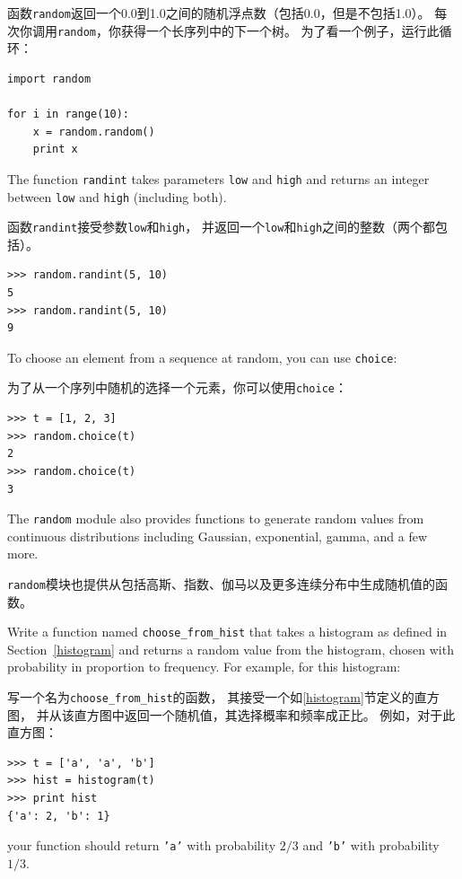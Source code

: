 \documentclass[10pt]{book}
\begin{document}
\begin{CJK}{UTF8}{gbsn}
函数{\tt random}返回一个0.0到1.0之间的随机浮点数（包括0.0，但是不包括1.0）。
每次你调用{\tt random}，你获得一个长序列中的下一个树。
为了看一个例子，运行此循环：

\begin{verbatim}
import random

for i in range(10):
    x = random.random()
    print x
\end{verbatim}
%
The function {\tt randint} takes parameters {\tt low} and
{\tt high} and returns an integer between {\tt low} and
{\tt high} (including both).

函数{\tt randint}接受参数{\tt low}和{\tt high}，
并返回一个{\tt low}和{\tt high}之间的整数（两个都包括）。

\begin{verbatim}
>>> random.randint(5, 10)
5
>>> random.randint(5, 10)
9
\end{verbatim}
%
To choose an element from a sequence at random, you can use
{\tt choice}:

为了从一个序列中随机的选择一个元素，你可以使用{\tt choice}：

\begin{verbatim}
>>> t = [1, 2, 3]
>>> random.choice(t)
2
>>> random.choice(t)
3
\end{verbatim}
%
The {\tt random} module also provides functions to generate
random values from continuous distributions including
Gaussian, exponential, gamma, and a few more.


{\tt random}模块也提供从包括高斯、指数、伽马以及更多连续分布中生成随机值的函数。

\begin{exercise}

Write a function named \verb"choose_from_hist" that takes
a histogram as defined in Section~\ref{histogram} and returns a 
random value from the histogram, chosen with probability
in proportion to frequency.  For example, for this histogram:

写一个名为\verb"choose_from_hist"的函数，
其接受一个如\ref{histogram}节定义的直方图，
并从该直方图中返回一个随机值，其选择概率和频率成正比。
例如，对于此直方图：

\begin{verbatim}
>>> t = ['a', 'a', 'b']
>>> hist = histogram(t)
>>> print hist
{'a': 2, 'b': 1}
\end{verbatim}
%
your function should return {\tt 'a'} with probability $2/3$ and {\tt 'b'}
with probability $1/3$.


\end{exercise}
\end{CJK}
\end{document}
